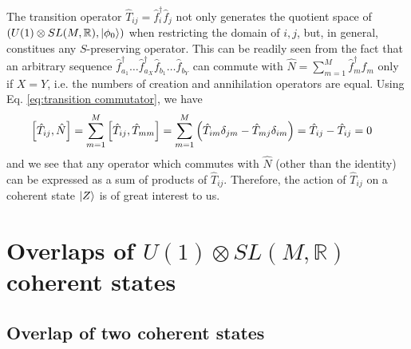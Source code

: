 \documentclass[12pt]{article}
\newcommand{\hc}{^\dagger}
\begin{document}
	The transition operator $\hat{T}_{ij}=\hat{f}\hc_i\hat{f}_j$ not only generates the quotient space of $(U(1)\otimes SL(M,\mathbb{R}), \ket{\phi_0})$ when restricting the domain of $i,j$, but, in general, constitues any $S$-preserving operator. This can be readily seen from the fact that an arbitrary sequence $\hat{f}\hc_{a_1}\dots\hat{f}\hc_{a_X}\hat{f}_{b_1}\dots\hat{f}_{b_Y}$ can commute with $\hat{N}=\sum_{m=1}^M\hat{f}\hc_m\hat{f}_m$ only if $X=Y$, i.e. the numbers of creation and annihilation operators are equal. Using Eq. \ref{eq:transition commutator}, we have
	\begin{align}\label{eq:transition commutes with N}
	\comm{\hat{T}_{ij}}{\hat{N}}&=\sum_{m=1}^M\comm{\hat{T}_{ij}}{\hat{T}_{mm}}=\sum_{m=1}^M\left(\hat{T}_{im}\delta_{jm}-\hat{T}_{mj}\delta_{im}\right)=\hat{T}_{ij}-\hat{T}_{ij}=0
	\end{align}
	and we see that any operator which commutes with $\hat{N}$ (other than the identity) can be expressed as a sum of products of $\hat{T}_{ij}$. Therefore, the action of $\hat{T}_{ij}$ on a coherent state $\ket{Z}$ is of great interest to us.
	
	\section{Overlaps of $U(1)\otimes SL(M,\mathbb{R})$ coherent states} \label{sec:overlaps}
	
	\subsection{Overlap of two coherent states}
	
\end{document}
